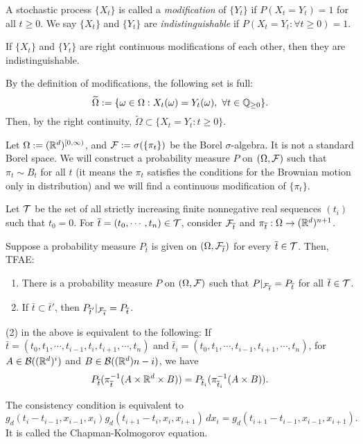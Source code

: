 \documentclass{../../../small}
\begin{document}
\begin{defn}[Modification]
A stochastic process $\{X_t\}$ is called a \emph{modification} of $\{Y_t\}$ if $P(X_t=Y_t)=1$ for all $t\ge0$.
We say $\{X_t\}$ and $\{Y_t\}$ are \emph{indistinguishable} if $P(X_t=Y_t:\forall t\ge0)=1$.
\end{defn}
\begin{prop}
If $\{X_t\}$ and $\{Y_t\}$ are right continuous modifications of each other, then they are indistinguishable.
\end{prop}
\begin{pf}
By the definition of modifications, the following set is full:
\[\tilde\Omega:=\{\omega\in\Omega:X_t(\omega)=Y_t(\omega),\ \forall t\in\Q_{\ge0}\}.\]
Then, by the right continuity, $\tilde\Omega\subset\{X_t=Y_t:t\ge0\}$.
\end{pf}

Let $\Omega:=(\mathbb{R}^d)^{[0,\infty)}$, and $\mathcal{F}:=\sigma(\{\pi_t\})$ be the Borel $\sigma$-algebra.
It is not a standard Borel space.
We will construct a probability measure $P$ on $(\Omega,\mathcal{F})$ such that $\pi_t\sim B_t$ for all $t$ (it means the $\pi_t$ satisfies the conditions for the Brownian motion only in distribution) and we will find a continuous modification of $\{\pi_t\}$.

Let $\mathcal{T}$ be the set of all strictly increasing finite nonnegative real sequences $(t_i)$ such that $t_0=0$.
For $\overline t=(t_0,\cdots,t_n)\in\mathcal{T}$, consider $\mathcal{F}_{\overline t}$ and $\pi_{\overline t}:\Omega\to(\mathbb{R}^d)^{n+1}$.
\begin{thm}
Suppose a probability measure $P_{\bar t}$ is given on $(\Omega,\mathcal{F}_{\overline t})$ for every $\overline t\in\mathcal{T}$.
Then, TFAE:
\begin{enumerate}[(1)]
\item There is a probability measure $P$ on $(\Omega,\mathcal{F})$ such that $P|_{\mathcal{F}_{\overline t}}=P_{\overline t}$ for all $\overline t\in\mathcal{T}$.
\item If $\bar t\subset\bar t'$, then $P_{\overline t'}|_{\mathcal{F}_{\overline t}}=P_{\overline t}$.
\end{enumerate}
\end{thm}
\begin{rmk*}
(2) in the above is equivalent to the following:
If $\bar t=(t_0,t_1,\cdots,t_{i-1},t_i,t_{i+1},\cdots,t_n)$ and $\bar t_i=(t_0,t_1,\cdots,t_{i-1},t_{i+1},\cdots,t_n)$, for $A\in\mathcal{B}((\mathbb{R}^d)^i)$ and $B\in\mathcal{B}((\mathbb{R}^d){n-i})$, we have
\[P_{\overline t}(\pi_{\overline t}^{-1}(A\times\mathbb{R}^d\times B))=P_{\overline t_i}(\pi_{\overline t_i}^{-1}(A\times B)).\]
\end{rmk*}
\begin{rmk*}
The consistency condition is equivalent to
\[g_d(t_i-t_{i-1},x_{i-1},x_i)g_d(t_{i+1}-t_i,x_i,x_{i+1})\,dx_i=g_d(t_{i+1}-t_{i-1},x_{i-1},x_{i+1}).\]
It is called the Chapman-Kolmogorov equation.
\end{rmk*}
\end{document}

